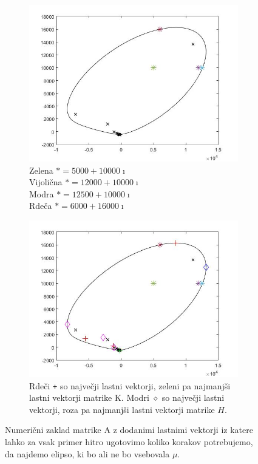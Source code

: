 \documentclass[12pt,a4paper]{amsart}
\theoremstyle{definition}
\theoremstyle{plain}
\begin{document}
\begin{figure}[H]
\renewcommand*\thesubfigure{\Alph{subfigure}}
\begin{subfigure}[t]{0.5\textwidth}
\includegraphics[width=0.9\linewidth]{CC.jpg}
\caption{Zelena $\ast = 5000+10000\imath$\\
Vijolična $\ast = 12000+10000\imath$\\
Modra $\ast = 12500+10000\imath$\\
Rdeča $\ast = 6000+16000\imath$\\}

\end{subfigure}%
\hfill
\begin{subfigure}[t]{0.5\textwidth}
\includegraphics[width=0.9\linewidth]{CCC.jpg}
\caption{Rdeči \verb~+~ so največji lastni vektorji, zeleni pa najmanjši lastni vektorji matrike K. Modri $\diamond$ so največji lastni vektorji, roza pa najmanjši lastni vektorji matrike $H$.\footnotemark[\value{footnote}]}
\end{subfigure}
\caption{Numerični zaklad matrike A z dodanimi lastnimi vektorji iz katere lahko za vsak primer hitro ugotovimo koliko korakov potrebujemo, da najdemo elipso, ki bo ali ne bo vsebovala $\mu$.}
\label{fig:p7}
\end{figure}
\end{document}
